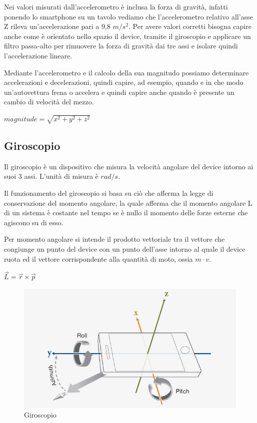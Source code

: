 \documentclass[12pt,a4paper,openright,twoside]{report}
\begin{document}
Nei valori misurati dall'accelerometro è inclusa la forza di gravità, infatti ponendo lo smartphone su un tavolo vediamo che l'accelerometro relativo all'asse Z rileva un'accelerazione pari a 9,8 $m/s^2$.
Per avere valori corretti bisogna capire anche come è orientato nello spazio il device, tramite il giroscopio e applicare un filtro passa-alto per rimuovere la forza di gravità dai tre assi e isolare quindi l'accelerazione lineare.

Mediante l'accelerometro e il calcolo della sua magnitudo possiamo determinare accelerazioni e decelerazioni, quindi capire, ad esempio, quando e in che modo un'autovettura frena o accelera e quindi capire anche quando è presente un cambio di velocità del mezzo. \cite{K1, K2, K3, K4, K5, K6}

\begin{center}
$ magnitude = \sqrt{ x^2 + y^2 + z^2}$
\end{center}

\subsection{Giroscopio}
Il giroscopio è un dispositivo che misura la velocità angolare del device intorno ai suoi 3 assi. L'unità di misura è $rad/s$. 

Il funzionamento del giroscopio si basa su ciò che afferma la legge di conservazione del momento angolare, la quale afferma che il momento angolare L di un sistema è costante nel tempo se è nullo il momento delle forze esterne che agiscono su di esso.

Per momento angolare si intende il prodotto vettoriale tra il vettore che congiunge un punto del device con un punto dell'asse intorno al quale il device ruota ed il vettore corrispondente alla quantità di moto, ossia $m \cdot v$.
\begin{center}
$\overrightarrow{L} =  \overrightarrow{r} \times \overrightarrow{p}$
\end{center}

\begin{figure}[h!]
\centering 
\includegraphics[scale=0.6]{fig6} 
\caption{Giroscopio} 
\end{figure}
\end{document}
